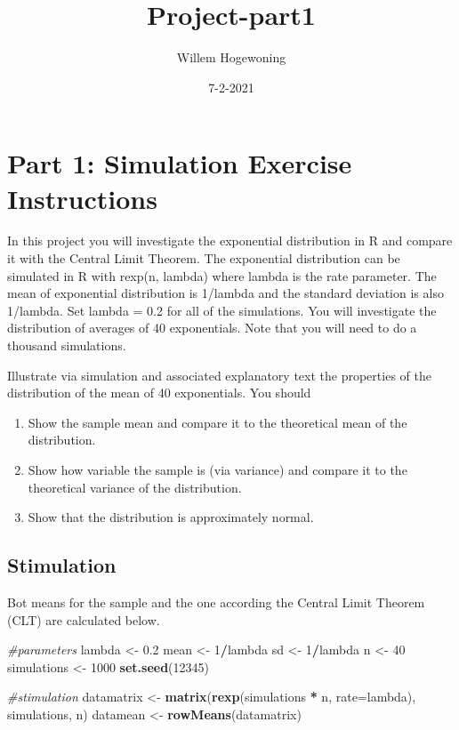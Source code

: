 \documentclass[
]{article}
\title{Project-part1}
\author{Willem Hogewoning}
\date{7-2-2021}
\newenvironment{Shaded}{\begin{snugshade}}{\end{snugshade}}
\newcommand{\CommentTok}[1]{\textcolor[rgb]{0.56,0.35,0.01}{\textit{#1}}}
\newcommand{\DataTypeTok}[1]{\textcolor[rgb]{0.13,0.29,0.53}{#1}}
\newcommand{\DecValTok}[1]{\textcolor[rgb]{0.00,0.00,0.81}{#1}}
\newcommand{\FloatTok}[1]{\textcolor[rgb]{0.00,0.00,0.81}{#1}}
\newcommand{\KeywordTok}[1]{\textcolor[rgb]{0.13,0.29,0.53}{\textbf{#1}}}
\newcommand{\NormalTok}[1]{#1}
\newcommand{\OperatorTok}[1]{\textcolor[rgb]{0.81,0.36,0.00}{\textbf{#1}}}
\newcommand{\StringTok}[1]{\textcolor[rgb]{0.31,0.60,0.02}{#1}}
\providecommand{\tightlist}{%
  \setlength{\itemsep}{0pt}\setlength{\parskip}{0pt}}
\begin{document}
\maketitle

\hypertarget{part-1-simulation-exercise-instructions}{%
\section{Part 1: Simulation Exercise
Instructions}\label{part-1-simulation-exercise-instructions}}

In this project you will investigate the exponential distribution in R
and compare it with the Central Limit Theorem. The exponential
distribution can be simulated in R with rexp(n, lambda) where lambda is
the rate parameter. The mean of exponential distribution is 1/lambda and
the standard deviation is also 1/lambda. Set lambda = 0.2 for all of the
simulations. You will investigate the distribution of averages of 40
exponentials. Note that you will need to do a thousand simulations.

Illustrate via simulation and associated explanatory text the properties
of the distribution of the mean of 40 exponentials. You should

\begin{enumerate}
\def\labelenumi{\arabic{enumi}.}
\tightlist
\item
  Show the sample mean and compare it to the theoretical mean of the
  distribution.
\item
  Show how variable the sample is (via variance) and compare it to the
  theoretical variance of the distribution.
\item
  Show that the distribution is approximately normal.
\end{enumerate}

\hypertarget{stimulation}{%
\subsection{Stimulation}\label{stimulation}}

Bot means for the sample and the one according the Central Limit Theorem
(CLT) are calculated below.

\begin{Shaded}
\begin{Highlighting}[]
\CommentTok{#parameters}
\NormalTok{lambda <-}\StringTok{ }\FloatTok{0.2}
\NormalTok{mean <-}\StringTok{ }\DecValTok{1}\OperatorTok{/}\NormalTok{lambda}
\NormalTok{sd <-}\StringTok{ }\DecValTok{1}\OperatorTok{/}\NormalTok{lambda}
\NormalTok{n <-}\StringTok{ }\DecValTok{40}
\NormalTok{simulations <-}\StringTok{ }\DecValTok{1000}
\KeywordTok{set.seed}\NormalTok{(}\DecValTok{12345}\NormalTok{)}

\CommentTok{#stimulation}
\NormalTok{datamatrix <-}\StringTok{ }\KeywordTok{matrix}\NormalTok{(}\KeywordTok{rexp}\NormalTok{(simulations }\OperatorTok{*}\StringTok{ }\NormalTok{n, }\DataTypeTok{rate=}\NormalTok{lambda), simulations, n)}
\NormalTok{datamean <-}\StringTok{ }\KeywordTok{rowMeans}\NormalTok{(datamatrix)         }
\end{Highlighting}
\end{Shaded}
\end{document}
